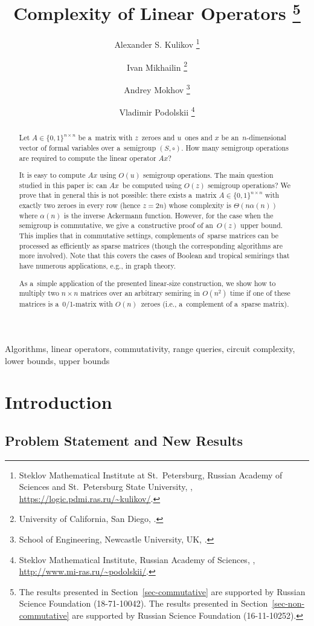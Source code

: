 \documentclass[review,onefignum,onetabnum]{siamart190516}
\title{Complexity of Linear Operators
\thanks{The results presented in Section~\ref{sec-commutative} are supported by
Russian Science Foundation (18-71-10042). The results presented in
Section~\ref{sec-non-commutative} are supported by Russian Science Foundation
(16-11-10252).}}
\author{Alexander S. Kulikov
  \thanks{Steklov Mathematical Institute at St.~Petersburg, Russian Academy of
  Sciences and St.~Petersburg State University, \email{kulikov@logic.pdmi.ras.ru},
  \url{https://logic.pdmi.ras.ru/\~kulikov/}.}
\and Ivan Mikhailin
  \thanks{University of California, San Diego, \email{imikhail@eng.ucsd.edu}.}
\and Andrey Mokhov
  \thanks{School of Engineering, Newcastle University, UK,
  \email{andrey.mokhov@ncl.ac.uk}.}
\and Vladimir Podolskii
  \thanks{Steklov Mathematical Institute, Russian Academy of Sciences,
  \email{podolskii@mi-ras.ru}, \url{http://www.mi-ras.ru/\~podolskii/}.}}
\begin{document}
\maketitle

\begin{abstract}
Let $A \in \{0,1\}^{n \times n}$ be a~matrix with $z$~zeroes
and $u$~ones and $x$ be an~$n$-dimensional vector of
formal variables over a~semigroup $(S, \circ)$.
How many semigroup operations are required to compute the linear operator $Ax$?


It is easy to compute $Ax$ using $O(u)$ semigroup operations.
The main question studied in this paper is:
can $Ax$~be computed using $O(z)$ semigroup operations?
We prove that in general this is not possible: there exists
a~matrix $A \in \{0,1\}^{n \times n}$ with exactly two zeroes in every row
(hence $z=2n$) whose complexity is $\Theta(n\alpha(n))$
where $\alpha(n)$ is the inverse Ackermann function.
However, for the case when the semigroup is commutative,
we give a~constructive proof of an~$O(z)$ upper bound.
This implies that in commutative settings, complements of~sparse
matrices can
be processed as efficiently as sparse matrices (though the
corresponding
algorithms are more involved). Note that this covers the
cases of Boolean and tropical semirings that have numerous
applications, e.g., in graph theory.

As a~simple application of the presented linear-size construction,
we show
how to multiply two $n\times n$ matrices over an arbitrary
semiring in $O(n^2)$
time if one of these matrices is a~0/1-matrix with $O(n)$~zeroes
(i.e., a~complement of a~sparse matrix).
\end{abstract}

\begin{keywords}
Algorithms, linear operators, commutativity, range queries, circuit complexity,
lower bounds, upper bounds
\end{keywords}


\section{Introduction}
\subsection{Problem Statement and New Results}
\end{document}
